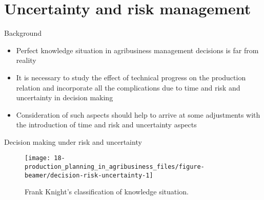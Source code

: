 \documentclass[12pt,ignorenonframetext,aspectratio=169]{beamer}
\providecommand{\tightlist}{%
  \setlength{\itemsep}{0pt}\setlength{\parskip}{0pt}}
\begin{document}
\hypertarget{uncertainty-and-risk-management}{%
\section{Uncertainty and risk
management}\label{uncertainty-and-risk-management}}

\begin{frame}{Background}
\protect\hypertarget{background-1}{}
\begin{itemize}
\tightlist
\item
  Perfect knowledge situation in agribusiness management decisions is
  far from reality
\item
  It is necessary to study the effect of technical progress on the
  production relation and incorporate all the complications due to time
  and risk and uncertainty in decision making
\item
  Consideration of such aspects should help to arrive at some
  adjustments with the introduction of time and risk and uncertainty
  aspects
\end{itemize}
\end{frame}

\begin{frame}{Decision making under risk and uncertainty}
\protect\hypertarget{decision-making-under-risk-and-uncertainty}{}
\begin{figure}
\texttt{[image: 18-production\_planning\_in\_agribusiness\_files/figure-beamer/decision-risk-uncertainty-1]} \caption{Frank Knight's classification of knowledge situation.}\label{fig:decision-risk-uncertainty}
\end{figure}
\end{frame}
\end{document}
